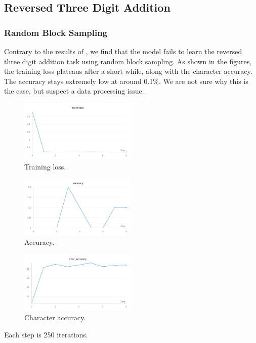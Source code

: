 \documentclass[12pt]{article}
\begin{document}
\subsection{Reversed Three Digit Addition}
\subsubsection{Random Block Sampling}
Contrary to the results of \cite{lee2023teaching}, we find that the model fails to learn the reversed three digit addition task using random block sampling.
As shown in the figures, the training loss plateaus after a short while, along with the character accuracy.
The accuracy stays extremely low at around 0.1\%.
We are not sure why this is the case, but suspect a data processing issue.
\begin{figure}[h]
    \centering
    \includegraphics[width=0.5\textwidth]{figures/three-digit-reverse/three-digit-reverse-loss.png}
    \caption{Training loss.}
    \label{fig:reversed_three_digit_addition}
\end{figure}
\begin{figure}[h]
    \centering
    \includegraphics[width=0.5\textwidth]{figures/three-digit-reverse/three-digit-reverse-accuracy.png}
    \caption{Accuracy.}
    \label{fig:reversed_three_digit_addition_accuracy}
\end{figure}
\begin{figure}[h]
    \centering
    \includegraphics[width=0.5\textwidth]{figures/three-digit-reverse/three-digit-reverse-char-accuracy.png}
    \caption{Character accuracy.}
    \label{fig:reversed_three_digit_addition_char_accuracy}
\end{figure}
Each step is 250 iterations.
\end{document}
